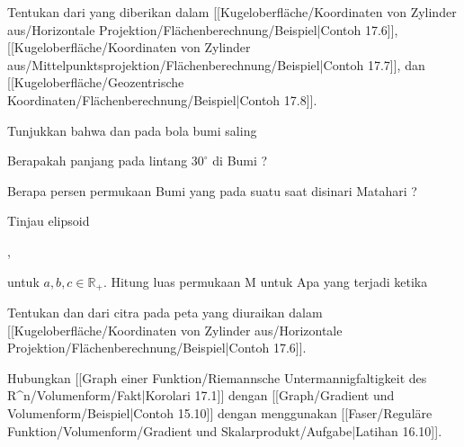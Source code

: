 {}
{

Tentukan
 {} {}
dari
yang diberikan dalam
[[Kugeloberfläche/Koordinaten von Zylinder aus/Horizontale Projektion/Flächenberechnung/Beispiel|Contoh 17.6]],
[[Kugeloberfläche/Koordinaten von Zylinder aus/Mittelpunktsprojektion/Flächenberechnung/Beispiel|Contoh 17.7]],
dan
[[Kugeloberfläche/Geozentrische Koordinaten/Flächenberechnung/Beispiel|Contoh 17.8]].

}
{} {}

{}
{

Tunjukkan bahwa
dan
pada bola bumi saling

}
{} {}

{}
{

Berapakah panjang
 pada lintang $30^\circ$ di Bumi
 {} {?}

}
{} {}

{}
{

Berapa persen permukaan Bumi yang pada suatu saat disinari Matahari
 {} {?}

}
{} {}

{}
{

Tinjau elipsoid

 { , }

untuk $a,b,c\in\mathbb{R}_{+}$. Hitung luas permukaan M untuk
 Apa yang terjadi ketika

}
{} {}

{}
{

Tentukan
dan
dari
citra
pada peta yang diuraikan dalam
[[Kugeloberfläche/Koordinaten von Zylinder aus/Horizontale Projektion/Flächenberechnung/Beispiel|Contoh 17.6]].

}
{} {}

{}
{

Hubungkan
[[Graph einer Funktion/Riemannsche Untermannigfaltigkeit des R^n/Volumenform/Fakt|Korolari 17.1]]
dengan
[[Graph/Gradient und Volumenform/Beispiel|Contoh 15.10]]
dengan menggunakan
[[Faser/Reguläre Funktion/Volumenform/Gradient und Skalarprodukt/Aufgabe|Latihan 16.10]].

}
{} {}

